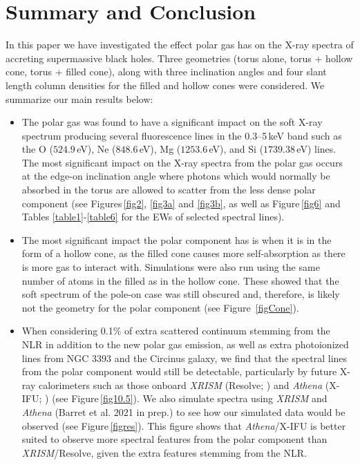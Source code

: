 \documentclass[fleqn,usenatbib]{mnras}
\begin{document}
    \section{Summary and Conclusion}
    
        In this paper we have investigated the effect polar gas has on the X-ray spectra of accreting supermassive black holes. Three geometries (torus alone, torus + hollow cone, torus + filled cone), along with three inclination angles and four slant length column densities for the filled and hollow cones were considered. We summarize our main results below:
        
        \begin{itemize}
            \item The polar gas was found to have a significant impact on the soft X-ray spectrum producing several fluorescence lines in the 0.3--5\,keV band such as the O ($524.9$\,eV), Ne ($848.6$\,eV), Mg ($1253.6$\,eV), and Si ($1739.38$\,eV) lines. The most significant impact on the X-ray spectra from the polar gas occurs at the edge-on inclination angle where photons which would normally be absorbed in the torus are allowed to scatter from the less dense polar component (see Figures\,\ref{fig2}, \ref{fig3a} and \ref{fig3b}, as well as Figure\,\ref{fig6} and Tables \ref{table1}-\ref{table6} for the EWs of selected spectral lines). 
            \item The most significant impact the polar component has is when it is in the form of a hollow cone, as the filled cone causes more self-absorption as there is more gas to interact with. Simulations were also run using the same number of atoms in the filled as in the hollow cone. These showed that the soft spectrum of the pole-on case was still obscured and, therefore, is likely not the geometry for the polar component (see Figure \,\ref{figCone}). 
            \item When considering 0.1\% of extra scattered continuum stemming from the NLR in addition to the new polar gas emission, as well as extra photoionized lines from NGC 3393 and the Circinus galaxy, we find that the spectral lines from the polar component would still be detectable, particularly by future X-ray calorimeters such as those onboard \textit{XRISM} (Resolve; \citealp{xrismscienceteam2020science}) and \textit{Athena} (X-IFU; \citealp{2016SPIE.9905E..2FB}) (see Figure\,\ref{fig10.5}). We also simulate spectra using \textit{XRISM} and \textit{Athena} (Barret et al. 2021 in prep.) to see how our simulated data would be observed (see Figure\,\ref{figres}). This figure shows that \textit{Athena}/X-IFU is better suited to observe more spectral features from the polar component than \textit{XRISM}/Resolve, given the extra features stemming from the NLR.  

\end{itemize}
\end{document}

